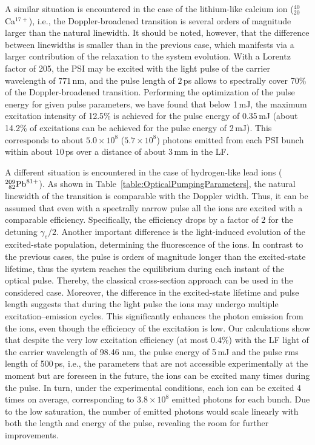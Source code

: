 A similar situation is encountered in the case of the lithium-like calcium ion ($^{40}_{20}$Ca$^{17+}$), i.e., the Doppler-broadened transition is several orders of magnitude larger than the natural linewidth.  It should be noted, however, that the difference between linewidths is smaller than in the previous case, which manifests via a larger contribution of the relaxation to the system evolution.  With a Lorentz factor of 205, the PSI may be excited with the light pulse of the carrier wavelength of $771\,$nm, and the pulse length of $2\,$ps allows to spectrally cover 70\% of the Doppler-broadened transition.  Performing the optimization of the pulse energy for given pulse parameters, we have found that below 1\,mJ, the maximum excitation intensity of 12.5\% is achieved for the pulse energy of 0.35\,mJ (about 14.2\% of excitations can be achieved for the pulse energy of 2\,mJ).  This corresponds to about $5.0\times 10^{8}$ ($5.7\times 10^{8}$) photons emitted from each PSI bunch within about $10\,$ps over a distance of about $3\,$mm in the LF.

A different situation is encountered in the case of hydrogen-like lead ions ($^{209}_{\phantom{0}82}{\rm Pb}^{81+}$).  As shown in Table~\ref{table:OpticalPumpingParameters}, the natural linewidth of the transition is comparable with the Doppler width.  Thus, it can be assumed that even with a spectrally narrow pulse all the ions are excited with a comparable efficiency. Specifically, the efficiency drops by a factor of $2$ for the detuning $\gamma_e/2$. Another important difference is the light-induced evolution of the excited-state population, determining the fluorescence of the ions.  In contrast to the previous cases, the pulse is orders of magnitude longer than the excited-state lifetime, thus the system reaches the equilibrium during each instant of the optical pulse. Thereby, the classical cross-section approach can be used in the considered case.  Moreover, the difference in the excited-state lifetime and pulse length suggests that during the light pulse the ions may undergo multiple excitation--emission cycles.  This significantly enhances the photon emission from the ions, even though the efficiency of the excitation is low.  Our calculations show that despite the very low excitation efficiency (at most 0.4\%) with the LF light of the carrier wavelength of 98.46 nm, the pulse energy of 5\,mJ and the pulse rms length of 500\,ps, i.e., the parameters that are not accessible experimentally at the moment but are foreseen in the future, the ions can be excited many times during the pulse.  In turn, under the experimental conditions, each ion can be excited 4 times on average, corresponding to $3.8\times 10^8$ emitted photons for each bunch.  Due to the low saturation, the number of emitted photons would scale linearly with both the length and energy of the pulse, revealing the room for further improvements.

